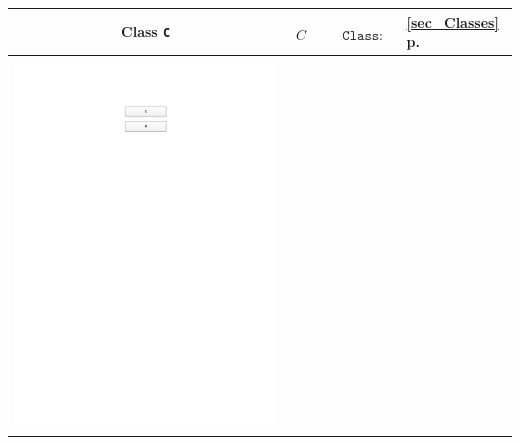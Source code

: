 \begin{longtable}{|>{\scriptsize}c|>{\scriptsize}l|>{\scriptsize}l|>{\scriptsize}p{0.8cm}|}
\begin{minipage}{\umltablespacing}
       Class \texttt{C}       
       \vspace{2mm}
    \end{minipage}
    &
    \begin{minipage}{\dltablespacing}
       $\begin{aligned}  
       \\
	  C
         \end{aligned}$       
    \end{minipage}
    &
      $\begin{aligned}
	  &\texttt{}\\
	  &\texttt{Class: C}
     \end{aligned}$
    &
    \ref{sec_Classes} \linebreak p. \pageref{sec_Classes}\\[1mm]
    \hline
    \begin{minipage}{\umltablespacing}  
      \centering\includegraphics[trim = 85mm 238mm 70mm 28mm, clip, scale=0.75]{./diagrams/chapter5/DisjointClasses}

\end{minipage}
\end{longtable}
